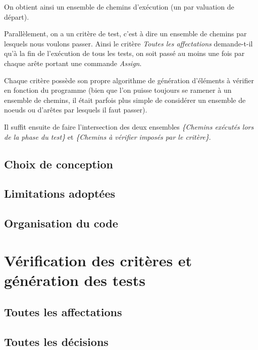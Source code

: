 \documentclass[a4paper, 12pt]{report}
\begin{document}
On obtient ainsi un ensemble de chemins d'exécution (un par valuation de départ).

Parallèlement, on a un critère de test, c'est à dire un ensemble de chemins par lesquels nous voulons passer. Ainsi le critère \textit{Toutes les affectations} demande-t-il qu'à la fin de l'exécution de tous les tests, on soit passé au moins une fois par chaque arête portant une commande \textit{Assign}.

Chaque critère possède son propre algorithme de génération d'éléments à vérifier en fonction du programme (bien que l'on puisse toujours se ramener à un ensemble de chemins, il était parfois plus simple de considérer un ensemble de noeuds ou d'arêtes par lesquels il faut passer).

Il suffit ensuite de faire l'intersection des deux ensembles \textit{\{Chemins exécutés lors de la phase du test\}} et \textit{\{Chemins à vérifier imposés par le critère\}}.


\section{Choix de conception}

\section{Limitations adoptées}

\section{Organisation du code}



\chapter{Vérification des critères et génération des tests}

\section{Toutes les affectations}
\section{Toutes les décisions}
\end{document}
